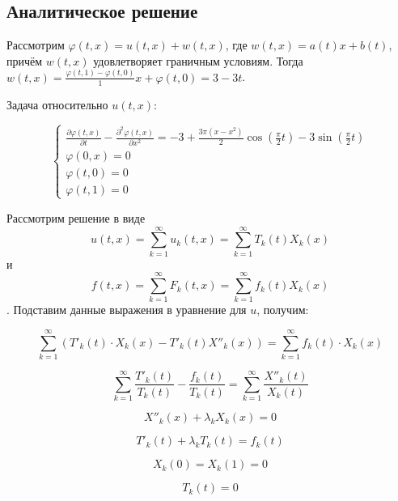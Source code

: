 \documentclass[14pt,a4paper]{scrartcl}
\begin{document}
\subsection*{Аналитическое решение}

Рассмотрим $\varphi(t,x) = u(t,x) + w(t,x)$, где $w(t,x) = a(t)x + b(t)$, причём $w(t,x)$ удовлетворяет граничным условиям. Тогда $w(t,x) = \frac{\varphi(t,1) - \varphi(t,0)}{1}x + \varphi(t,0) = 3-3t$.

Задача относительно $u(t,x)$:

\begin{equation*}
	\left\{\begin{array}{c}
	\frac{\partial \varphi(t, x)}{\partial t}-\frac{\partial^{2} \varphi(t, x)}{\partial x^{2}}=-3+\frac{3 \pi\left(x-x^{2}\right)}{2}\cos(\frac{\pi}{2}t) - 3\sin(\frac{\pi}{2}t) \\
	\varphi(0, x)=0 \\
	\varphi(t, 0)=0 \\
	\varphi(t, 1)=0
	\end{array}\right.
\end{equation*}

Рассмотрим решение в виде $${u(t,x) = \sum\limits_{k=1}^\infty u_k(t,x) = \sum\limits_{k=1}^\infty T_k(t)X_k(x)}$$ и $${f(t,x) = \sum\limits_{k=1}^\infty F_k(t,x) = \sum\limits_{k=1}^\infty f_k(t)X_k(x)}$$. Подставим данные выражения в уравнение для $u$, получим:

\begin{equation*}
	\sum\limits_{k=1}^\infty (T'_k(t) \cdot X_k(x) - T'_k(t)X''_k(x)) = \sum\limits_{k = 1}^\infty f_k(t)\cdot X_k(x)
\end{equation*}

\begin{equation*}
	\sum\limits_{k=1}^\infty \frac{T'_k(t)}{T_k(t)} - \frac{f_k(t)}{T_k(t)} = \sum\limits_{k=1}^\infty \frac{X''_k(t)}{X_k(t)}
\end{equation*}

\begin{equation*}
	X''_k(x) + \lambda_kX_k(x) = 0
\end{equation*}

\begin{equation*}
	T'_k(t) + \lambda_kT_k(t) = f_k(t)
\end{equation*}

\begin{equation*}
	X_k(0) = X_k(1) = 0
\end{equation*}

\begin{equation*}
	T_k(t) = 0
\end{equation*}
\end{document}
